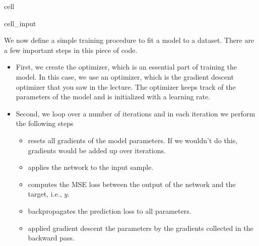 \documentclass[letterpaper,10pt,english]{jupyterBook}
\begin{document}
\begin{sphinxuseclass}{cell}\begin{sphinxVerbatimInput}

\begin{sphinxuseclass}{cell_input}
\begin{sphinxVerbatim}[commandchars=\\\{\}]
  
\end{sphinxVerbatim}

\end{sphinxuseclass}\end{sphinxVerbatimInput}

\end{sphinxuseclass}
\sphinxAtStartPar
We now define a simple training procedure to fit a model to a dataset. There are a few  important steps in this piece of code.
\begin{itemize}
\item {} 
\sphinxAtStartPar
First, we create the optimizer, which is an essential part of training the model. In this case, we use an  optimizer, which is the gradient descent optimizer that you saw in the lecture. The optimizer keeps track of the parameters of the model and is initialized with a learning rate.

\item {} 
\sphinxAtStartPar
Second, we loop over a number of iterations and in each iteration we perform the following steps
\begin{itemize}
\item {} 
\sphinxAtStartPar
{} resets all gradients of the model parameters. If we wouldn’t do this, gradients would be added up over iterations.

\item {} 
\sphinxAtStartPar
{} applies the network to the input sample.

\item {} 
\sphinxAtStartPar
{} computes the MSE loss between the output of the network and the target, i.e., \(y\).

\item {} 
\sphinxAtStartPar
{} backpropagates the prediction loss to all parameters.

\item {} 
\sphinxAtStartPar
{} applied gradient descent the parameters by the gradients collected in the backward pass.

\end{itemize}

\end{itemize}
\end{document}
